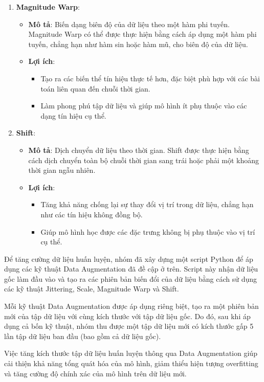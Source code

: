 \begin{enumerate}
\item \textbf{Magnitude Warp}: 
\begin{itemize}
\item \textbf{Mô tả}: Biến dạng biên độ của dữ liệu theo một hàm phi tuyến. Magnitude Warp có thể được thực hiện bằng cách áp dụng một hàm phi tuyến, chẳng hạn như hàm sin hoặc hàm mũ, cho biên độ của dữ liệu.
\item \textbf{Lợi ích}:
\begin{itemize}
\item Tạo ra các biến thể tín hiệu thực tế hơn, đặc biệt phù hợp với các bài toán liên quan đến chuỗi thời gian.
\item Làm phong phú tập dữ liệu và giúp mô hình ít phụ thuộc vào các dạng tín hiệu cụ thể.
 \end{itemize}
\end{itemize}

\item \textbf{Shift}: 
 \begin{itemize}
 \item \textbf{Mô tả}: Dịch chuyển dữ liệu theo thời gian. Shift được thực hiện bằng cách dịch chuyển toàn bộ chuỗi thời gian sang trái hoặc phải một khoảng thời gian ngẫu nhiên.
 \item \textbf{Lợi ích}:
\begin{itemize}
\item Tăng khả năng chống lại sự thay đổi vị trí trong dữ liệu, chẳng hạn như các tín hiệu không đồng bộ.
\item Giúp mô hình học được các đặc trưng không bị phụ thuộc vào vị trí cụ thể.
\end{itemize}
\end{itemize}

\end{enumerate}

Để tăng cường dữ liệu huấn luyện, nhóm đã xây dựng một script Python để áp dụng các kỹ thuật Data Augmentation đã đề cập ở trên. Script này nhận dữ liệu gốc làm đầu vào và tạo ra các phiên bản biến đổi của dữ liệu bằng cách sử dụng các kỹ thuật Jittering, Scale, Magnitude Warp và Shift.

Mỗi kỹ thuật Data Augmentation được áp dụng riêng biệt, tạo ra một phiên bản mới của tập dữ liệu với cùng kích thước với tập dữ liệu gốc. Do đó, sau khi áp dụng cả bốn kỹ thuật, nhóm thu được một tập dữ liệu mới có kích thước gấp 5 lần tập dữ liệu ban đầu (bao gồm cả dữ liệu gốc). 

Việc tăng kích thước tập dữ liệu huấn luyện thông qua Data Augmentation giúp cải thiện khả năng tổng quát hóa của mô hình, giảm thiểu hiện tượng overfitting và tăng cường độ chính xác của mô hình trên dữ liệu mới.
